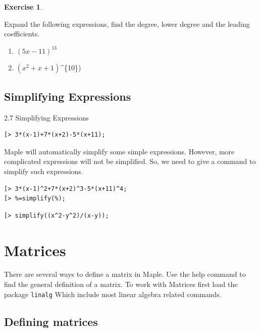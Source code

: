 \documentclass[
]{book}
\providecommand{\tightlist}{%
  \setlength{\itemsep}{0pt}\setlength{\parskip}{0pt}}
\theoremstyle{definition}
\theoremstyle{definition}
\theoremstyle{definition}
\newtheorem{exercise}{Exercise}[chapter]
\theoremstyle{definition}
\theoremstyle{remark}
\begin{document}
\begin{exercise}
\protect\hypertarget{exr:unnamed-chunk-17}{}\label{exr:unnamed-chunk-17}

Expand the following expressions, find the degree, lower degree and the leading coefficients.

\begin{enumerate}
\def\labelenumi{\roman{enumi}.}
\tightlist
\item
  \((5x − 11)^{13}\)
\item
  \((x^2 + x + 1)\)\^{}\{10\})
\end{enumerate}

\end{exercise}

\section{Simplifying Expressions}\label{simplifying-expressions}

2.7 Simplifying Expressions

\begin{verbatim}
[> 3*(x-1)+7*(x+2)-5*(x+11);
\end{verbatim}

Maple will automatically simplify some simple expressions. However, more complicated expressions will not be simplified. So, we need to give a command to simplify such expressions.

\begin{verbatim}
[> 3*(x-1)^2+7*(x+2)^3-5*(x+11)^4;
[> %=simplify(%);
\end{verbatim}

\begin{verbatim}
[> simplify((x^2-y^2)/(x-y));
\end{verbatim}

\chapter{Matrices}\label{matrices}

There are several ways to define a matrix in Maple. Use the help command to find the general definition of a matrix. To work with Matrices first load the package \texttt{linalg} Which include most linear algebra related commands.

\section{Defining matrices}\label{defining-matrices}
\end{document}
